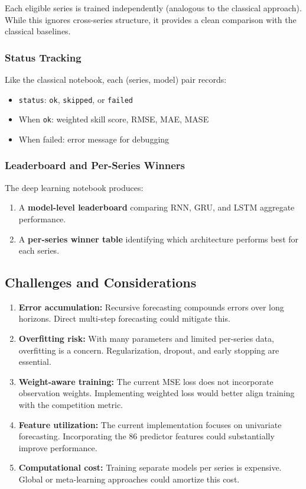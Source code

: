 Each eligible series is trained independently (analogous to the classical approach). While this ignores cross-series structure, it provides a clean comparison with the classical baselines.

\subsubsection{Status Tracking}

Like the classical notebook, each (series, model) pair records:
\begin{itemize}
    \item \texttt{status}: \texttt{ok}, \texttt{skipped}, or \texttt{failed}
    \item When \texttt{ok}: weighted skill score, RMSE, MAE, MASE
    \item When failed: error message for debugging
\end{itemize}

\subsubsection{Leaderboard and Per-Series Winners}

The deep learning notebook produces:
\begin{enumerate}
    \item A \textbf{model-level leaderboard} comparing RNN, GRU, and LSTM aggregate performance.
    \item A \textbf{per-series winner table} identifying which architecture performs best for each series.
\end{enumerate}

\subsection{Challenges and Considerations}

\begin{enumerate}
    \item \textbf{Error accumulation:} Recursive forecasting compounds errors over long horizons. Direct multi-step forecasting could mitigate this.
    \item \textbf{Overfitting risk:} With many parameters and limited per-series data, overfitting is a concern. Regularization, dropout, and early stopping are essential.
    \item \textbf{Weight-aware training:} The current MSE loss does not incorporate observation weights. Implementing weighted loss would better align training with the competition metric.
    \item \textbf{Feature utilization:} The current implementation focuses on univariate forecasting. Incorporating the 86 predictor features could substantially improve performance.
    \item \textbf{Computational cost:} Training separate models per series is expensive. Global or meta-learning approaches could amortize this cost.
\end{enumerate}


